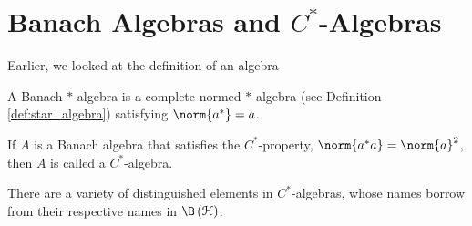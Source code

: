 \section{Banach Algebras and \texorpdfstring{$C^{\ast}$-Algebras}{C*-Algebras}}%
Earlier, we looked at the definition of an algebra
\begin{definition}
  A Banach $\ast$-algebra is a complete normed $\ast$-algebra (see Definition \ref{def:star_algebra}) satisfying $\norm{a^{\ast}} = a$.\newline

  If $A$ is a Banach algebra that satisfies the $C^{\ast}$-property, $\norm{a^{\ast}a} = \norm{a}^2$, then $A$ is called a $C^{\ast}$-algebra.
\end{definition}
There are a variety of distinguished elements in $C^{\ast}$-algebras, whose names borrow from their respective names in $\B\left(\mathcal{H}\right)$.
